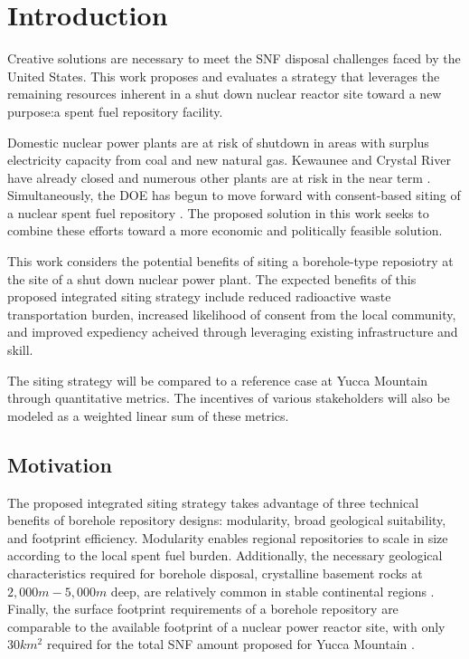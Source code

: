 
\section{Introduction}
Creative solutions are necessary to meet the \gls{SNF} disposal challenges 
faced by the United States.
This work proposes and evaluates a strategy that leverages the 
remaining resources inherent in a shut down nuclear reactor site toward a new 
purpose:a spent fuel repository facility.

Domestic nuclear power plants are at risk of shutdown in areas with surplus 
electricity capacity from coal and new natural gas. Kewaunee and Crystal River 
have already closed  and numerous other plants are at risk in the near term 
\cite{nei_nuclear_2016}.  Simultaneously, the \gls{DOE} 
has begun to move forward with consent-based siting of a nuclear 
spent fuel repository \cite{doe_designing_2016}. The proposed solution in this 
work seeks to combine these efforts toward a more economic and politically 
feasible solution. 

This work considers the potential benefits of siting a borehole-type reposiotry 
at the site of a shut down nuclear power plant.  The  expected benefits of this 
proposed integrated siting strategy include reduced radioactive waste 
transportation burden, increased likelihood of consent from the local 
community, and improved expediency acheived through leveraging existing 
infrastructure and skill.

The siting strategy will be compared to a reference case at 
Yucca Mountain through quantitative metrics. The incentives of various 
stakeholders will also be modeled as a weighted linear sum of these 
metrics. 

\subsection{Motivation}
The proposed integrated siting strategy takes advantage of three technical 
benefits of borehole repository designs: modularity, broad geological 
suitability, and footprint efficiency. Modularity enables regional repositories 
to scale in size according to the local spent fuel burden. 
Additionally, the necessary geological characteristics required for borehole 
disposal, crystalline basement rocks at $2,000 m - 5,000 m$ deep, are relatively 
common in stable continental regions \cite{arnold_research_2012}. Finally, the 
surface footprint requirements of a borehole repository are comparable to the 
available footprint of a nuclear power reactor site, with only $30 km^2$ 
required for the total \gls{SNF} amount proposed for Yucca Mountain 
\cite{brady_deep_2009}.

